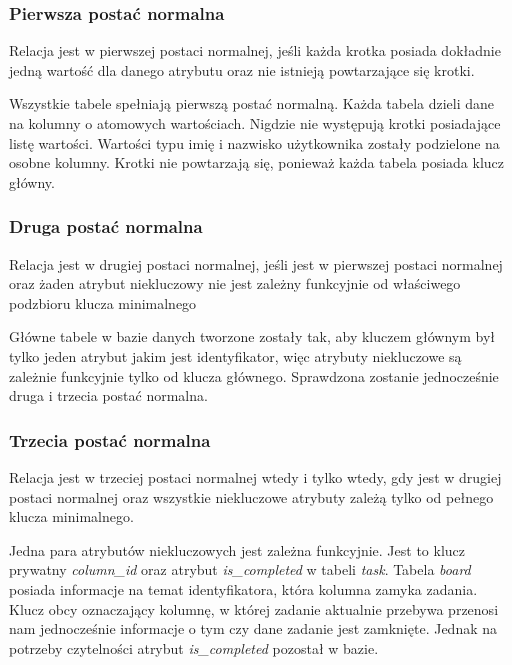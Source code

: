 \subsubsection{Pierwsza postać normalna}
\begin{definition}
	Relacja jest w pierwszej postaci normalnej, jeśli każda krotka posiada dokładnie jedną wartość dla danego atrybutu oraz nie istnieją powtarzające się krotki.
\end{definition}
Wszystkie tabele spełniają pierwszą postać normalną. Każda tabela dzieli dane na kolumny o atomowych wartościach. Nigdzie nie występują krotki posiadające listę wartości. Wartości typu imię i nazwisko użytkownika zostały podzielone na osobne kolumny. Krotki nie powtarzają się, ponieważ każda tabela posiada klucz główny.

\subsubsection{Druga  postać normalna}
\begin{definition}
	Relacja jest w drugiej postaci normalnej, jeśli jest w pierwszej postaci normalnej oraz żaden atrybut niekluczowy nie jest zależny funkcyjnie od właściwego podzbioru
	klucza minimalnego
\end{definition}
Główne tabele w bazie danych tworzone zostały tak, aby kluczem głównym był tylko jeden atrybut jakim jest identyfikator, więc atrybuty niekluczowe są zależnie funkcyjnie tylko od klucza głównego. Sprawdzona zostanie jednocześnie druga i trzecia postać normalna.
\subsubsection{Trzecia  postać normalna}
\begin{definition}
	Relacja jest w trzeciej postaci normalnej wtedy i tylko wtedy, gdy jest w drugiej postaci normalnej oraz
	wszystkie niekluczowe atrybuty zależą tylko od pełnego klucza
	minimalnego.
\end{definition}

 Jedna para atrybutów niekluczowych jest zależna funkcyjnie. Jest to klucz prywatny \textit{column\_id} oraz atrybut \textit{is\_completed} w tabeli \textit{task}. Tabela  \textit{board} posiada informacje na temat identyfikatora, która kolumna zamyka zadania. Klucz obcy oznaczający kolumnę, w której zadanie aktualnie przebywa przenosi nam jednocześnie informacje o tym czy dane zadanie jest zamknięte. Jednak na potrzeby czytelności atrybut \textit{is\_completed} pozostał w bazie.
\clearpage
